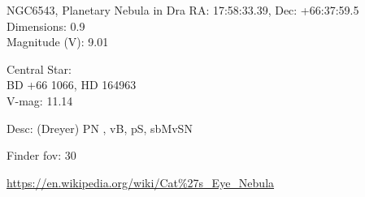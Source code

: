 \begin{block}{NGC6543, Planetary Nebula in Dra}
    RA: 17:58:33.39, Dec: +66:37:59.5 \\ 
    Dimensions: 0.9 \\ 
    Magnitude (V): 9.01

    Central Star: \\ 
      \hspace{1em}BD +66 1066, HD 164963 \\ 
      \hspace{1em}V-mag: 11.14 

    Desc: (Dreyer) PN , vB, pS, sbMvSN 

    Finder fov: 30 

    \url{https://en.wikipedia.org/wiki/Cat%27s_Eye_Nebula} 
\end{block}